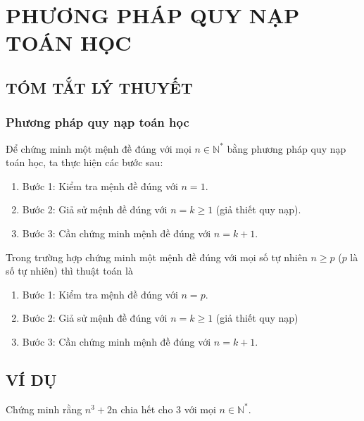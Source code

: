 \setcounter{section}{2}
\section{PHƯƠNG PHÁP QUY NẠP TOÁN HỌC}
\subsection{TÓM TẮT LÝ THUYẾT}
\subsubsection{Phương pháp quy nạp toán học}
Để chứng minh một mệnh đề đúng với mọi $n\in\mathbb{N}^*$ bằng phương pháp quy nạp toán học, ta thực hiện các bước sau:
\begin{enumerate}
	\item[] Bước 1: Kiểm tra mệnh đề đúng với $n=1$.
	\item[] Bước 2: Giả sử mệnh đề đúng với $n=k\ge 1$ (giả thiết quy nạp).
	\item[] Bước 3: Cần chứng minh mệnh đề đúng với $n=k+1$.
\end{enumerate}
\begin{note}
	Trong trường hợp chứng minh một mệnh đề đúng với mọi số tự nhiên $n\ge p$ ($p$ là số tự nhiên) thì thuật toán là 
	\begin{enumerate}
		\item[] Bước 1: Kiểm tra mệnh đề đúng với $n=p$.
		\item[] Bước 2: Giả sử mệnh đề đúng với $n=k\ge 1$ (giả thiết quy nạp)
		\item[] Bước 3: Cần chứng minh mệnh đề đúng với $n=k+1$.
	\end{enumerate}
\end{note}
\subsection{VÍ DỤ}
\begin{vd}
	Chứng minh rằng $n^3+2 \mathrm{n}$ chia hết cho 3 với mọi $n \in \mathbb{N}^*$.
\end{vd}

